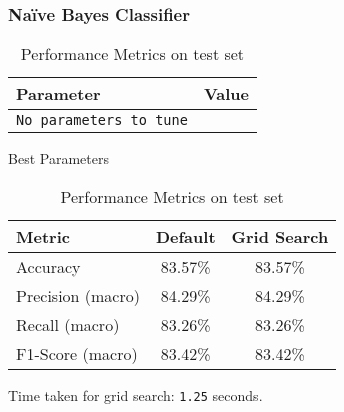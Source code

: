 \subsubsection{Na\"{i}ve Bayes Classifier}
\begin{table}[h!]
  \begin{minipage}{.5\linewidth}
    \centering
    \begin{tabular}{|l|l|}
      \hline
      \textbf{Parameter} & \textbf{Value} \\
      \hline
      \texttt{No parameters to tune} & \\
      \hline
    \end{tabular}
    \caption{Best Parameters}
  \end{minipage}%
  \begin{minipage}{.5\linewidth}
    \centering
    \begin{tabular}{|l|c|c|}
      \hline
      \textbf{Metric} & \textbf{Default} & \textbf{Grid Search} \\
      \hline
      Accuracy & 83.57\% & 83.57\% \\
      Precision (macro) & 84.29\% & 84.29\% \\
      Recall (macro) & 83.26\% & 83.26\% \\
      F1-Score (macro) & 83.42\% & 83.42\% \\
      \hline
    \end{tabular}
    \caption{Performance Metrics on test set}
  \end{minipage}
\end{table}


Time taken for grid search: \texttt{1.25} seconds.
\newpage
